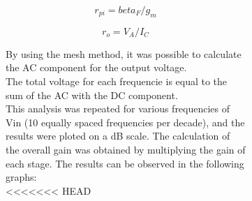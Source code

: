 \begin{figure} [!htb]
\begin{figure} [!htb]
\begin{equation}
 r_{pi}= {beta}_{F}/g_{m}
   \label{}
\end{equation} 

\begin{equation}
  r_{o}= V_{A}/I_{C}
  \label{}
\end{equation} 

By using the mesh method, it was possible to calculate the AC component for the output voltage.\\
The total voltage for each frequencie is equal to the sum of the AC with the DC component.\\

This analysis was repeated for various frequencies of Vin (10 equally spaced frequencies per decade), and the results were ploted on a dB scale.
The calculation of the overall gain was obtained by multiplying the gain of each stage. The results can be observed in the following graphs:\\ 

<<<<<<< HEAD



\end{figure}
\end{figure}
